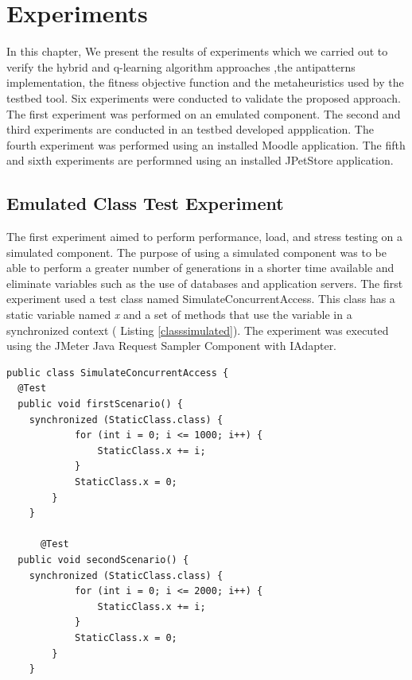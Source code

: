 \chapter{Experiments}

In this chapter, We present the results of experiments which we carried out to verify the hybrid and q-learning algorithm approaches ,the antipatterns  implementation, the fitness objective function and the metaheuristics used by the testbed tool.   Six experiments were conducted to validate the proposed approach. The first experiment was performed on an emulated component. The second and third experiments are conducted in an testbed developed appplication. The fourth  experiment was performed using an installed Moodle application. The fifth and sixth experiments are performned using an installed JPetStore application.

\section{Emulated Class Test Experiment}


The first experiment aimed to perform performance, load, and stress testing on a simulated component. The purpose of using a simulated component was to be able to perform a greater number of generations in a shorter time available and eliminate variables such as the use of databases and application servers. The first experiment used a test class  named SimulateConcurrentAccess. This class has a static variable named \textit{x} and a set of methods that use the variable in a synchronized context ( Listing \ref{classsimulated}). The experiment was executed using the JMeter Java Request Sampler Component with IAdapter.


\begin{lstlisting}[style=outline,caption={SimulateConcurrentAccess class},float,label=classsimulated]
public class SimulateConcurrentAccess {
  @Test
  public void firstScenario() {		
    synchronized (StaticClass.class) {
			for (int i = 0; i <= 1000; i++) {
				StaticClass.x += i;
			}
			StaticClass.x = 0;
		}
	}
	
	  @Test
  public void secondScenario() {		
    synchronized (StaticClass.class) {
			for (int i = 0; i <= 2000; i++) {
				StaticClass.x += i;
			}
			StaticClass.x = 0;
		}
	}
\end{lstlisting}


